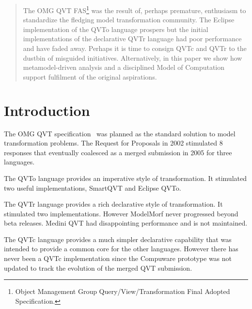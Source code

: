 \documentclass[conference]{IEEEtran}
\begin{document}
\begin{abstract}
The OMG QVT FAS\footnote{Object Management Group Query/View/Transformation Final Adopted Specification.} was the result of, perhaps premature, enthusiasm to standardize the fledging model transformation community. The Eclipse implementation of the QVTo language prospers but the initial implementations of the declarative QVTr language had poor performance and have faded away. Perhaps it is time to consign QVTc and QVTr to the dustbin of misguided initiatives. Alternatively, in this paper we show how metamodel-driven analysis and a disciplined Model of Computation support fulfilment of the original aspirations.
\end{abstract}





%
\IEEEpeerreviewmaketitle



\section{Introduction}

The OMG QVT specification~\cite{QVT-1.3} was planned as the standard solution to model transformation problems. The Request for Proposals in 2002 stimulated 8 responses that eventually coalesced as a merged submission in 2005 for three languages.

The QVTo language provides an imperative style of transformation. It stimulated two useful implementations, SmartQVT and Eclipse QVTo. %

The QVTr language provides a rich declarative style of transformation. It stimulated two implementations. However ModelMorf never progressed beyond beta releases. 
Medini QVT had disappointing performance and is not maintained.

The QVTc language provides a much simpler declarative capability that was intended to provide a common core for the other languages. However there has never been a QVTc implementation since the Compuware prototype was not updated to track the evolution of the merged QVT submission.
\end{document}
